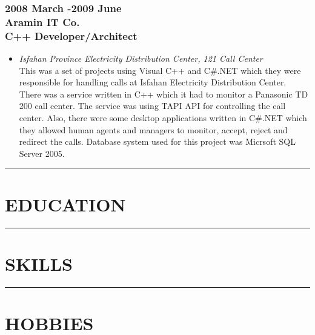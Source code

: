 \documentclass[10pt,a4paper]{article}
\begin{document}
\subsubsection{\textnormal {2008 March -2009 June} \\ \textnormal {Aramin IT Co.} \\ C++ Developer/Architect}
  \setlength{\leftskip}{0.5cm}
  \setlength{\rightskip}{1cm}
  \begin{itemize}
    \item \small \textit{Isfahan Province Electricity Distribution Center, 121 Call Center} \\					
		This was a set of projects using Visual C++ and C\#.NET which they were responsible for handling calls at Isfahan Electricity Distribution Center. There was a service written in C++ which it had to monitor a Panasonic TD 200 call center. The service was using TAPI API for controlling the call center. Also, there were some desktop applications written in C\#.NET which they allowed human agents and managers to monitor, accept, reject and redirect the calls. Database system used for this project was Micrsoft SQL Server 2005.
	\end{itemize}
  \setlength{\leftskip}{0pt}
  \setlength{\rightskip}{0cm}

\rule {15cm}{0.4pt}

\section{EDUCATION}

\rule {15cm}{0.4pt}

\section{SKILLS}

\rule {15cm}{0.4pt}

\section{HOBBIES}
\end{document}
